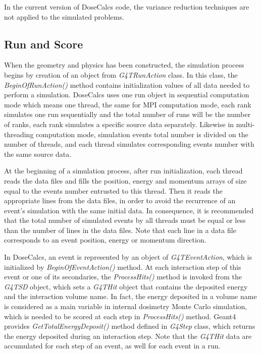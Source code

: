 \documentclass[letterpaper,12pt]{article}
\begin{document}
In the current version of DoseCalcs code, the variance reduction techniques are not applied to the simulated problems.

\subsection{Run and Score} 

When the geometry and physics has been constructed, the simulation process begins by creation of an object from \textit{G4TRunAction} class. In this class, the \textit{BeginOfRunAction()} method contains initialization values of all data needed to perform a simulation. DoseCalcs uses one run object in sequential computation mode which means one thread, the same for MPI computation mode, each rank simulates one run sequentially and the total number of runs will be the number of ranks, each rank simulates a specific source data separately. Likewise in multi-threading computation mode,  simulation events total number is divided on the number of threads, and each thread simulates corresponding events number with the same source data.

At the beginning of a simulation process, after run initialization, each thread reads the data files and fills the position, energy and momentum arrays of size equal to the events number entrusted to this thread. Then it reads the appropriate lines from the data files, in order to avoid the recurrence of an event's simulation with the same initial data. In consequence, it is recommended that the total number of simulated events by all threads must be equal or less than the number of lines in the data files. Note that each line in a data file corresponds to an event position, energy or momentum direction.

In DoseCalcs, an event is represented by an object of \textit{G4TEventAction}, which is initialized by \textit{BeginOfEventAction()} method. At each interaction step of this event or one of its secondaries, the \textit{ProcessHits()} method is invoked from the \textit{G4TSD} object, which sets a \textit{G4THit} object that contains the deposited energy and the interaction volume name.
In fact, the energy deposited in a volume name is considered as a main variable in internal dosimetry Monte Carlo simulation, which is needed to be scored at each step in \textit{ProcessHits()} method. Geant4 provides \textit{GetTotalEnergyDeposit()} method defined in \textit{G4Step} class, which returns the energy deposited during an interaction step. Note that the \textit{G4THit} data are accumulated for each step of an event, as well for each event in a run.
\end{document}

